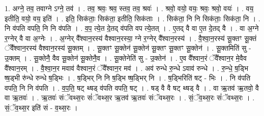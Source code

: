 \documentclass[17pt]{extarticle}
\begin{document}
1. अग्ने॒ तव॒ तवाग्ने ऽग्ने॒ तव॑ । . तव॒ श्रवः॒ श्रव॒ स्तव॒ तव॒ श्रवः॑ । . श्रवो॒ वयो॒ वयः॒ श्रवः॒ श्रवो॒ वयः॑ । . वय॒ इतीति॒ वयो॒ वय॒ इति॑ । . इति॒ सिक॑ताः॒ सिक॑ता॒ इतीति॒ सिक॑ताः । . सिक॑ता॒ नि नि सिक॑ताः॒ सिक॑ता॒ नि । . नि व॑पति वपति॒ नि नि व॑पति । . व॒प॒ त्ये॒त दे॒तद् व॑पति वप त्ये॒तत् । . ए॒तद् वै वा ए॒त दे॒तद् वै । . वा अ॒ग्ने र॒ग्नेर् वै वा अ॒ग्नेः । . अ॒ग्नेर् वै᳚श्वान॒रस्य॑ वैश्वान॒रस्या॒ ग्ने र॒ग्नेर् वै᳚श्वान॒रस्य॑ । . वै॒श्वा॒न॒रस्य॑ सू॒क्तꣳ सू॒क्तं ॅवै᳚श्वान॒रस्य॑ वैश्वान॒रस्य॑ सू॒क्तम् । . सू॒क्तꣳ सू॒क्तेन॑ सू॒क्तेन॑ सू॒क्तꣳ सू॒क्तꣳ सू॒क्तेन॑ । . सू॒क्तमिति॑ सु - उ॒क्तम् । . सू॒क्तेनै॒ वैव सू॒क्तेन॑ सू॒क्तेनै॒व । . सू॒क्तेनेति॑ सु - उ॒क्तेन॑ । . ए॒व वै᳚श्वान॒रं ॅवै᳚श्वान॒र मे॒वैव वै᳚श्वान॒रम् । . वै॒श्वा॒न॒र मवाव॑ वैश्वान॒रं ॅवै᳚श्वान॒र मव॑ । . अव॑ रुन्धे रु॒न्धे ऽवाव॑ रुन्धे । . रु॒न्धे॒ ष॒ड्भि ष्ष॒ड्भी रु॑न्धे रुन्धे ष॒ड्भिः । . ष॒ड्भिर् नि नि ष॒ड्भि ष्ष॒ड्भिर् नि । . ष॒ड्भिरिति॑ षट् - भिः । . नि व॑पति वपति॒ नि नि व॑पति । . व॒प॒ति॒ षट् थ्षड् व॑पति वपति॒ षट् । . षड् वै वै षट् थ्षड् वै । . वा ऋ॒तव॑ ऋ॒तवो॒ वै वा ऋ॒तवः॑ । . ऋ॒तवः॑ संॅवथ्स॒रः सं॑ॅवथ्स॒र ऋ॒तव॑ ऋ॒तवः॑ संॅवथ्स॒रः । . सं॒ॅव॒थ्स॒रः सं॑ॅवथ्स॒रः । . सं॒ॅव॒थ्स॒र इति॑ सं - व॒थ्स॒रः । \newline
\end{document}
